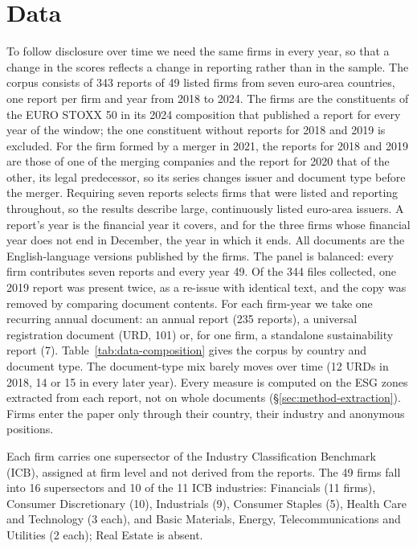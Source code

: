 \section{Data}
\label{sec:data}

To follow disclosure over time we need the same firms in every year, so that a
change in the scores reflects a change in reporting rather than in the sample.
The corpus consists of 343 reports of 49 listed firms from seven euro-area
countries, one report per firm and year from 2018 to 2024. The firms are the
constituents of the EURO STOXX 50 in its 2024 composition that published a
report for every year of the window; the one constituent without reports for
2018 and 2019 is excluded. For the firm formed by a merger in 2021, the reports
for 2018 and 2019 are those of one of the merging companies and the report for
2020 that of the other, its legal predecessor, so its series changes issuer and
document type before the merger. Requiring seven reports selects
firms that were listed and reporting throughout, so the results describe
large, continuously listed euro-area issuers. A report's year is the financial
year it covers, and for the three firms whose financial year does not end in
December, the year in which it ends. All documents are the English-language
versions published by the firms. The panel is
balanced: every firm contributes seven reports and every year 49. Of the 344
files collected, one 2019 report was present twice, as a re-issue with
identical text, and the copy was removed by comparing document contents. For
each firm-year we take one recurring annual document: an annual report
(235 reports), a universal registration document (URD, 101) or, for one firm,
a standalone sustainability report (7). Table~\ref{tab:data-composition} gives
the corpus by country and document type. The document-type mix barely moves
over time (12 URDs in 2018, 14 or 15 in every later year). Every measure is
computed on the ESG zones extracted from each report, not on whole documents
(\S\ref{sec:method-extraction}). Firms enter the paper only through their
country, their industry and anonymous positions.

Each firm carries one supersector of the Industry Classification Benchmark
(ICB), assigned at firm level and not derived from the reports. The 49 firms
fall into 16 supersectors and 10 of the 11 ICB industries: Financials (11
firms), Consumer Discretionary (10), Industrials (9), Consumer Staples (5),
Health Care and Technology (3 each), and Basic Materials, Energy,
Telecommunications and Utilities (2 each); Real Estate is absent.

